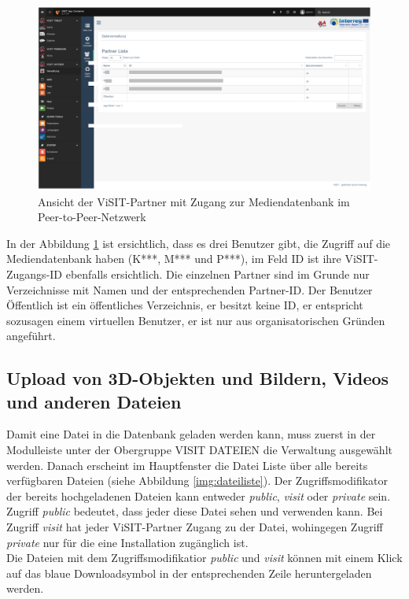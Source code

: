 \begin{figure}[ht!]
\centering
\includegraphics[width=12cm]{Figures/paula/dateiverwaltung/visit_partner.png}
\caption{Ansicht der ViSIT-Partner mit Zugang zur Mediendatenbank im Peer-to-Peer-Netzwerk}
\label{img:visit_partner}
\end{figure}

In der Abbildung \ref{img:visit_partner} ist ersichtlich, dass es drei Benutzer gibt, die Zugriff auf die Mediendatenbank haben (K***, M*** und P***), im Feld ID ist ihre ViSIT-Zugangs-ID ebenfalls ersichtlich. Die einzelnen Partner sind im Grunde nur Verzeichnisse mit Namen und der entsprechenden Partner-ID. Der Benutzer Öffentlich ist ein öffentliches Verzeichnis, er besitzt keine ID, er entspricht sozusagen einem virtuellen Benutzer, er ist nur aus organisatorischen Gründen angeführt.

\subsection{Upload von 3D-Objekten und Bildern, Videos und anderen Dateien}

Damit eine Datei in die Datenbank geladen werden kann, muss zuerst in der Modulleiste unter der Obergruppe VISIT DATEIEN die \glqq Verwaltung\grqq{} ausgewählt werden. Danach erscheint im Hauptfenster die \glqq Datei Liste\grqq{} über alle bereits verfügbaren Dateien (siehe Abbildung \ref{img:dateiliste}). Der Zugriffsmodifikator der bereits hochgeladenen Dateien kann entweder \textit{public}, \textit{visit} oder \textit{private} sein.\\
Zugriff \textit{public} bedeutet, dass jeder diese Datei sehen und verwenden kann. Bei Zugriff \textit{visit} hat jeder ViSIT-Partner Zugang zu der Datei, wohingegen Zugriff \textit{private} nur für die eine Installation zugänglich ist.\\
Die Dateien mit dem Zugriffsmodifikatior \textit{public} und \textit{visit} können mit einem Klick auf das blaue Downloadsymbol in der entsprechenden Zeile heruntergeladen werden.

